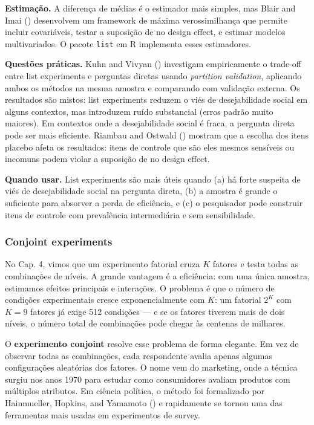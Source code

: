 \documentclass[
]{article}
\begin{document}
\textbf{Estimação.} A diferença de médias é o estimador mais simples, mas Blair and Imai () desenvolvem um framework de máxima verossimilhança que permite incluir covariáveis, testar a suposição de no design effect, e estimar modelos multivariados. O pacote \texttt{list} em R implementa esses estimadores.

\textbf{Questões práticas.} Kuhn and Vivyan () investigam empiricamente o trade-off entre list experiments e perguntas diretas usando \emph{partition validation}, aplicando ambos os métodos na mesma amostra e comparando com validação externa. Os resultados são mistos: list experiments reduzem o viés de desejabilidade social em alguns contextos, mas introduzem ruído substancial (erros padrão muito maiores). Em contextos onde a desejabilidade social é fraca, a pergunta direta pode ser mais eficiente. Riambau and Ostwald () mostram que a escolha dos itens placebo afeta os resultados: itens de controle que são eles mesmos sensíveis ou incomuns podem violar a suposição de no design effect.

\textbf{Quando usar.} List experiments são mais úteis quando (a) há forte suspeita de viés de desejabilidade social na pergunta direta, (b) a amostra é grande o suficiente para absorver a perda de eficiência, e (c) o pesquisador pode construir itens de controle com prevalência intermediária e sem sensibilidade.

\subsubsection{Conjoint experiments}\label{conjoint-experiments}

No Cap. 4, vimos que um experimento fatorial cruza \(K\) fatores e testa todas as combinações de níveis. A grande vantagem é a eficiência: com uma única amostra, estimamos efeitos principais e interações. O problema é que o número de condições experimentais cresce exponencialmente com \(K\): um fatorial \(2^K\) com \(K=9\) fatores já exige 512 condições --- e se os fatores tiverem mais de dois níveis, o número total de combinações pode chegar às centenas de milhares.

O \textbf{experimento conjoint} resolve esse problema de forma elegante. Em vez de observar todas as combinações, cada respondente avalia apenas algumas configurações aleatórias dos fatores. O nome vem do marketing, onde a técnica surgiu nos anos 1970 para estudar como consumidores avaliam produtos com múltiplos atributos. Em ciência política, o método foi formalizado por Hainmueller, Hopkins, and Yamamoto () e rapidamente se tornou uma das ferramentas mais usadas em experimentos de survey.
\end{document}
